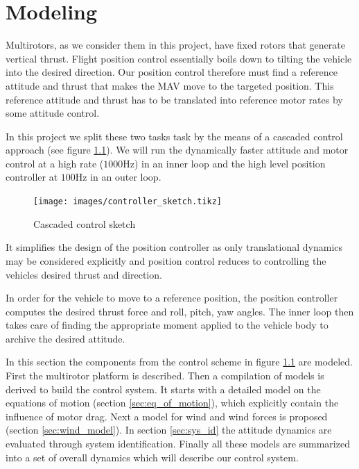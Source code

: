 \chapter{Modeling}
\label{sec:modeling}
Multirotors, as we consider them in this project, have fixed rotors that generate vertical thrust. Flight position control essentially boils down to tilting the vehicle into the desired direction. Our position control therefore must find a reference attitude and thrust that makes the MAV move to the targeted position. This reference attitude and thrust has to be translated into reference motor rates by some attitude control. 

In this project we split these two tasks task by the means of a cascaded control approach (see figure \ref{pics:controller_sketch}). We will run the dynamically faster attitude and motor control at a high rate ($1000 \si{\hertz}$) in an inner loop and the high level position controller at $100 \si{\hertz}$ in an outer loop. 
\begin{figure}
\centering
\texttt{[image: images/controller\_sketch.tikz]}
\caption{Cascaded control sketch}
\label{pics:controller_sketch}
\end{figure}

It simplifies the design of the position controller as only translational dynamics may be considered explicitly and position control reduces to controlling the vehicles desired thrust and direction. 

In order for the vehicle to move to a reference position, the position controller computes the desired thrust force and roll, pitch, yaw angles. The inner loop then takes care of finding the appropriate moment applied to the vehicle body to archive the desired attitude. 

In this section the components from the control scheme in figure \ref{pics:controller_sketch} are modeled. First the multirotor platform is described. Then a compilation of models is derived to build the control system. It starts with a detailed model on the equations of motion (section \ref{sec:eq_of_motion}), which explicitly contain the influence of motor drag. Next a model for wind and wind forces is proposed (section \ref{sec:wind_model}). In section \ref{sec:sys_id} the attitude dynamics are evaluated through system identification. Finally all these models are summarized into a set of overall dynamics which will describe our control system.

